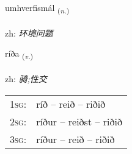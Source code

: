 \documentclass[frontgrid, backgrid]{flacards}\usepackage[]{graphicx}\usepackage[]{color}
\begin{document}
\renewcommand{\flhead}{\vskip5pt \fboxsep=0pt {\small\bfseries\footnotesize Nafnorð | 名词}}
\renewcommand{\fcfoot}{\vskip5pt \fboxsep=0pt \hspace{2pt}{\small\bfseries\footnotesize 2K}}

\renewcommand{\blhead}{\vskip5pt {\small\bfseries\footnotesize Nafnorð | 名词 }}
\renewcommand{\bcfoot}{\vskip5pt \hspace{2pt}{\small\bfseries\footnotesize 2K}}


{umhverfismál \small{\textsubscript{(\textit{n.})}} \\[1ex] %
\textphonetic{[ʏmkʰvɛrvɪsmaul]} \\
zh: \emph{环境问题} \\  [2ex]
\renewcommand*{\arraystretch}{0.8}
}

\renewcommand{\flhead}{\vskip5pt \fboxsep=0pt {\small\bfseries\footnotesize Sagnorð | 动词}}
\renewcommand{\fcfoot}{\vskip5pt \fboxsep=0pt \hspace{2pt}{\small\bfseries\footnotesize 2K}}

\renewcommand{\blhead}{\vskip5pt {\small\bfseries\footnotesize Sagnorð | 动词 }}
\renewcommand{\bcfoot}{\vskip5pt \hspace{2pt}{\small\bfseries\footnotesize 2K}}


{ríða \small{\textsubscript{(\textit{v.})}} \\[1ex] %
\textphonetic{[riːða]} \\
zh: \emph{骑;性交} \\  [2ex]
\renewcommand*{\arraystretch}{0.8}
\begin{tabular}{p{1cm}l}
\textsc{1sg}: & ríð -- reið -- riðið \\ 
\textsc{2sg}: & ríður -- reiðst -- riðið \\ 
\textsc{3sg}: & ríður -- reið -- riðið \\ 
\end{tabular}
}
\end{document}
